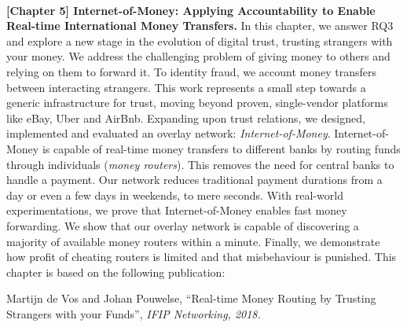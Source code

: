 \\

\textbf{[Chapter 5] Internet-of-Money: Applying Accountability to Enable Real-time International Money Transfers.}
In this chapter, we answer RQ3 and explore a new stage in the evolution of digital trust, trusting strangers with your money.
We address the challenging problem of giving money to others and relying on them to forward it.
To identity fraud, we account money transfers between interacting strangers.
This work represents a small step towards a generic infrastructure for trust, moving beyond proven, single-vendor platforms like eBay, Uber and AirBnb.
Expanding upon trust relations, we designed, implemented and evaluated an overlay network: \emph{Internet-of-Money}.
Internet-of-Money is capable of real-time money transfers to different banks by routing funds through individuals (\emph{money routers}).
This removes the need for central banks to handle a payment.
Our network reduces traditional payment durations from a day or even a few days in weekends, to mere seconds.
With real-world experimentations, we prove that Internet-of-Money enables fast money forwarding.
We show that our overlay network is capable of discovering a majority of available money routers within a minute.
Finally, we demonstrate how profit of cheating routers is limited and that misbehaviour is punished.
This chapter is based on the following publication:

Martijn de Vos and Johan Pouwelse, \enquote{Real-time Money Routing by Trusting Strangers with your Funds}, \emph{IFIP Networking, 2018.}\\

